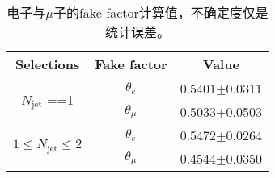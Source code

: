 \begin{table}[!ht]
\begin{center}
\begin{tabular}{c|c|c}
\hline
\hline
Selections  &Fake factor   &Value  \\
\hline
\multirow{2}{*}{$N_\text{jet}$ ==1} &$\theta_{e}$   &0.5401$\pm$0.0311    \\
\cline{2-3}
                                    &$\theta_{\mu}$ &0.5033$\pm$0.0503    \\
\hline
\multirow{2}{*}{$1\leq N_{\text{jet}} \leq 2$}  &$\theta_{e}$   &0.5472$\pm$0.0264    \\
\cline{2-3}
                                                &$\theta_{\mu}$ &0.4544$\pm$0.0350    \\
\hline
\hline
\end{tabular}
\caption{电子与$\mu$子的fake factor计算值，不确定度仅是统计误差。}
\label{tab:summary_fake_factor}
\end{center}
\end{table}
